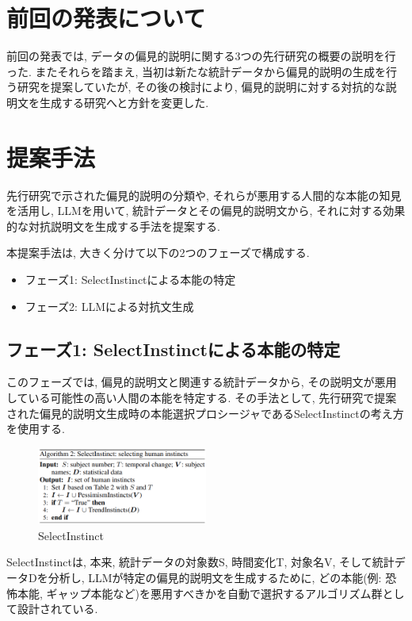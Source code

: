 \documentclass[dvipdfmx]{jsarticle}
\begin{document}
\section{前回の発表について}
前回の発表では, データの偏見的説明に関する3つの先行研究の概要の説明を行った.
またそれらを踏まえ, 当初は新たな統計データから偏見的説明の生成を行う研究を提案していたが,
その後の検討により, 偏見的説明に対する対抗的な説明文を生成する研究へと方針を変更した.

\section{提案手法}

先行研究で示された偏見的説明の分類や, それらが悪用する人間的な本能の知見を活用し, LLMを用いて, 統計データとその偏見的説明文から, それに対する効果的な対抗説明文を生成する手法を提案する.

本提案手法は, 大きく分けて以下の2つのフェーズで構成する.
\begin{itemize}
  \item フェーズ1: SelectInstinctによる本能の特定
  \item フェーズ2: LLMによる対抗文生成
\end{itemize}


\subsection{フェーズ1: SelectInstinctによる本能の特定}
このフェーズでは, 偏見的説明文と関連する統計データから, その説明文が悪用している可能性の高い人間の本能を特定する.
その手法として, 先行研究で提案された偏見的説明文生成時の本能選択プロシージャであるSelectInstinctの考え方を使用する\cite{anonymous2024}.

\begin{figure}[H]
  \centering
  \includegraphics[width=0.5\textwidth]{01.png}
  \caption{SelectInstinct}
  \label{fig:selectinstinct}
\end{figure}

SelectInstinctは, 本来, 統計データの対象数S, 時間変化T, 対象名V, そして統計データDを分析し,
LLMが特定の偏見的説明文を生成するために, どの本能(例: 恐怖本能, ギャップ本能など)を悪用すべきかを自動で選択するアルゴリズム群として設計されている.
\end{document}
